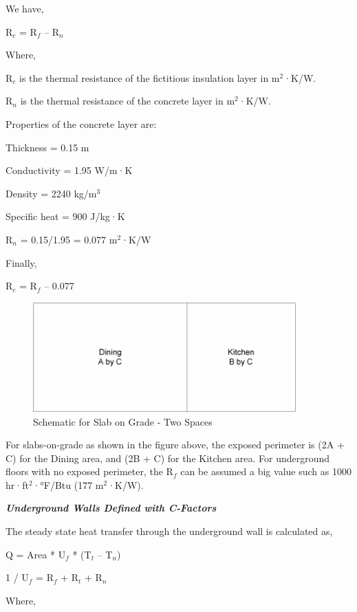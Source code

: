 We have,

R\(_{c}\) = R\(_{f}\) -- R\(_{n}\)

Where,

R\(_{c}\) is the thermal resistance of the fictitious insulation layer in m\(^{2}\)·K/W.

R\(_{n}\) is the thermal resistance of the concrete layer in m\(^{2}\)·K/W.

Properties of the concrete layer are:

Thickness = 0.15 m

Conductivity = 1.95 W/m·K

Density = 2240 kg/m\(^{3}\)

Specific heat = 900 J/kg·K

R\(_{n}\) = 0.15/1.95 = 0.077 m\(^{2}\)·K/W

Finally,

R\(_{c}\) = R\(_{f}\) -- 0.077

\begin{figure}[hbtp] %
\centering
\includegraphics[width=0.9\textwidth, height=0.9\textheight, keepaspectratio=true]{media/image435.png}
\caption{Schematic for Slab on Grade - Two Spaces \protect \label{fig:schematic-for-slab-on-grade-two-spaces}}
\end{figure}

For slabs-on-grade as shown in the figure above, the exposed perimeter is (2A + C) for the Dining area, and (2B + C) for the Kitchen area. For underground floors with no exposed perimeter, the R\(_{f}\) can be assumed a big value such as 1000 hr·ft\(^{2}\)·°F/Btu (177 m\(^{2}\)·K/W).

\textbf{\emph{Underground Walls Defined with C-Factors}}

The steady state heat transfer through the underground wall is calculated as,

Q = Area * U\(_{f}\) * (T\(_{t}\) -- T\(_{n}\))

1 / U\(_{f}\) = R\(_{f}\) + R\(_{t}\) + R\(_{n}\)

Where,

